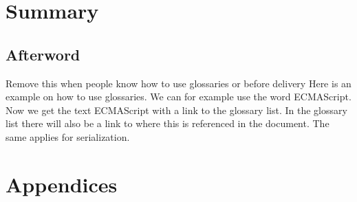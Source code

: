 \documentclass[BSP,english,oneside]{classes/gucthesis}
\newcommand{\comment}[1]{\textcolor{blue}{\emph{#1}}}
\newcommand{\todo}[1]{{\color{green}#1}}
\begin{document}
\part{Summary}

	\chapter{Afterword}
		\label{chap:afterword}
		


\todo{Remove this when people know how to use glossaries or before delivery}
Here is an example on how to use glossaries. We can for example use the word
\gls{ECMAScript}. Now we get the text ECMAScript with a link to the glossary
list. In the glossary list there will also be a link to where this is 
referenced in the document. The same applies for \gls{serialization}.






\printnoidxglossary[sort=word]


\part{Appendices}

\appendix %

% 

% 

% 


\end{document}
